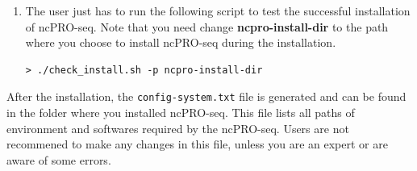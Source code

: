 \documentclass[12pt]{article}
\def \ncpip{ncPRO-seq}
\begin{document}
\begin{enumerate}
Common users without super-user privileges can only install the command-line version of \ncpip{}, as configurations of local web server need super-user permissions. The installation command is the following:
\begin{verbatim}
> cd ncPRO-seq.v1.6.1
> make install
\end{verbatim}
For the super-user or root user, the following commands can be used to install both command-line and local web server version of \ncpip{}:
\begin{verbatim}
> cd ncPRO-seq.v1.6.1
> sudo make install
\end{verbatim}
or
\begin{verbatim}
> su
> make install
\end{verbatim}
 \item The user just has to run the following script to test the successful installation of \ncpip{}. Note that you need change \textbf{ncpro-install-dir} to the path where you choose to install \ncpip{} during the installation.

\begin{verbatim}
> ./check_install.sh -p ncpro-install-dir
\end{verbatim}
\end{enumerate}

After the installation, the \verb+config-system.txt+ file is generated and can be found in the folder where you installed \ncpip{}. This file lists all paths of environment and softwares required by the \ncpip{}. Users are not recommened to make any changes in this file, unless you are an expert or are aware of some errors.

\label{subsection:configsys}
\end{document}
